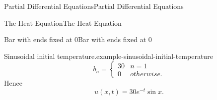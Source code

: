 \documentclass[10pt,]{book}
\numberwithin{equation}{section}
\newcommand{\amp}{&}
\begin{document}
\begin{chapterptx}{Partial Differential Equations}{}{Partial Differential Equations}{}{}
\begin{sectionptx}{The Heat Equation}{}{The Heat Equation}{}{}
\begin{subsectionptx}{Bar with ends fixed at \(0\)}{}{Bar with ends fixed at \(0\)}{}{}
\begin{example}{Sinusoidal initial temperature.}{example-sinusoidal-initial-temperature}
%
\begin{equation*}
b_{n} = \begin{cases} 30 \amp n=1 \\ 0 \amp otherwise.\end{cases}
\end{equation*}
\hypertarget{p-517}{}%
Hence%
%
\begin{equation*}
u(x,t) = 30e^{-t}\sin x.
\end{equation*}
\end{example}
\end{subsectionptx}
\end{sectionptx}
\end{chapterptx}
%
%
%
%
\typeout{************************************************}
\typeout{************************************************}
%
%
\appendix
%
\end{document}
